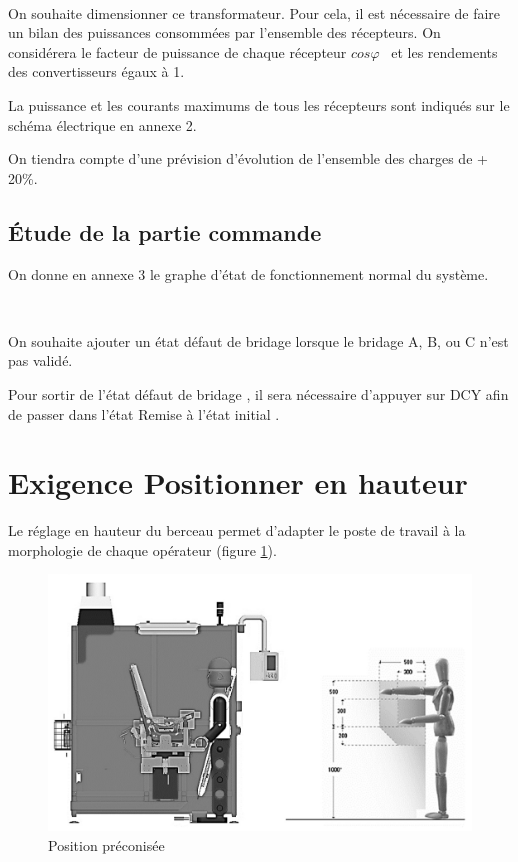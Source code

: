 
~\

On souhaite dimensionner ce transformateur. Pour cela, il est nécessaire de faire un bilan des puissances consommées par l’ensemble des récepteurs. On considérera le facteur de puissance de chaque récepteur \og $cos \varphi$ \fg\ et les rendements des convertisseurs égaux à 1.

La puissance et les courants maximums de tous les récepteurs sont indiqués sur le schéma électrique en annexe 2.

On tiendra compte d’une prévision d'évolution de l’ensemble des charges de + 20\%.


\subsection{Étude de la partie commande}

On donne en annexe 3 le graphe d’état de fonctionnement normal du système.


~\

On souhaite ajouter un état \og défaut de bridage \fg lorsque le bridage A, B, ou C n’est pas validé.

Pour sortir de l’état \og défaut de bridage \fg, il sera nécessaire d’appuyer sur DCY afin de passer dans l’état \og Remise à l’état initial \fg.


\section{Exigence \og Positionner en hauteur \fg}

Le réglage en hauteur du berceau permet d’adapter le poste de travail à la morphologie de chaque opérateur (figure \ref{img16}).

\begin{figure}[!h]
\centering\includegraphics[width=0.7\linewidth]{img/fig16}
 \caption{Position préconisée}
 \label{img16}
\end{figure}

